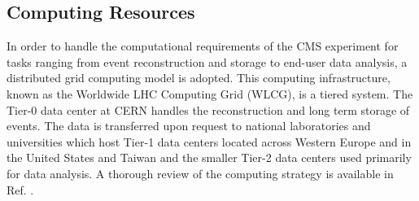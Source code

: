 \subsection{Computing Resources}

In order to handle the computational requirements of the CMS experiment for tasks ranging from event reconstruction and storage to end-user data analysis, a distributed grid computing model is adopted. This computing infrastructure, known as the Worldwide LHC Computing Grid (WLCG), is a tiered system. The Tier-0 data center at CERN handles the reconstruction and long term storage of events. The data is transferred upon request to national laboratories and universities which host Tier-1 data centers located across Western Europe and in the United States and Taiwan and the smaller Tier-2 data centers used primarily for data analysis. A thorough review of the computing strategy is available in Ref. \cite{CMSCOMPUTE}.

